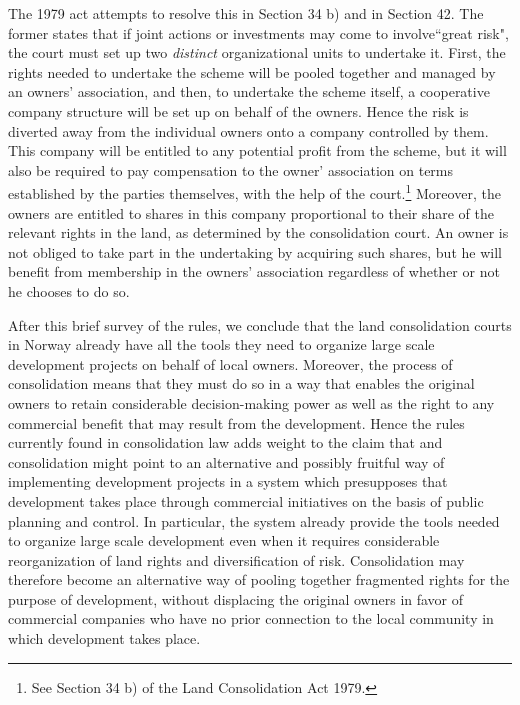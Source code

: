 \documentclass[10pt]{article} %
\begin{document}
The 1979 act attempts to resolve this in Section 34 b) and in Section 42. The former states that if joint actions or investments may come to involve``great risk", the court must set up two \emph{distinct} organizational units to undertake it. First, the rights needed to undertake the scheme will be pooled together and managed by an owners' association, and then, to undertake the scheme itself, a cooperative company structure will be set up on behalf of the owners. Hence the risk is diverted away from the individual owners onto a company controlled by them. This company will be entitled to any potential profit from the scheme, but it will also be required to pay compensation to the owner' association on terms established by the parties themselves, with the help of the court.\footnote{See Section 34 b) of the Land Consolidation Act 1979.} Moreover, the owners are entitled to shares in this company proportional to their share of the relevant rights in the land, as determined by the consolidation court. An owner is not obliged to take part in the undertaking by acquiring such shares, but he will benefit from membership in the owners' association regardless of whether or not he chooses to do so.

After this brief survey of the rules, we conclude that the land consolidation courts in Norway already have all the tools they need to organize large scale development projects on behalf of local owners. Moreover, the process of consolidation means that they must do so in a way that enables the original owners to retain considerable decision-making power as well as the right to any commercial benefit that may result from the development. Hence the rules currently found in consolidation law adds weight to the claim that and consolidation might point to an alternative and possibly fruitful way of implementing development projects in a system which presupposes that development takes place through commercial initiatives on the basis of public  planning and control. In particular, the system already provide the tools needed to organize
large scale development even when it requires considerable reorganization of land rights and diversification of risk. Consolidation may therefore become an alternative way of pooling together fragmented rights for the purpose of development, without displacing the original owners in favor of commercial companies who have no prior connection to the local community in which development takes place.
\end{document}
